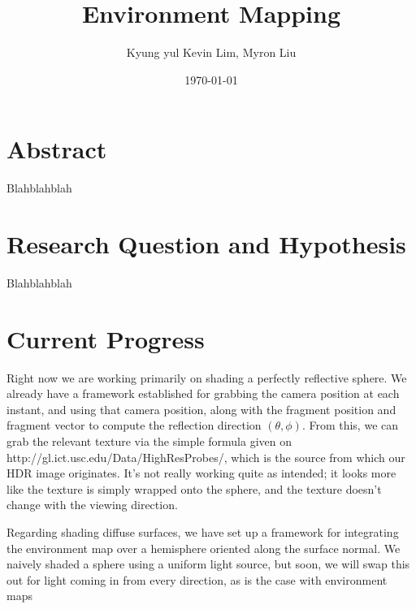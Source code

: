 \documentclass[12pt]{article}
\begin{document}
\title{Environment Mapping}
\author{Kyung yul Kevin Lim, Myron Liu}
\date{\today}
\maketitle

\section{Abstract}
Blahblahblah

\section{Research Question and Hypothesis}
Blahblahblah

\section{Current Progress}


Right now we are working primarily on shading a perfectly reflective sphere. We already have a framework established for grabbing the camera position at each instant, and using that camera position, along with the fragment position and fragment vector to compute the reflection direction $(\theta,\phi)$. From this, we can grab the relevant texture via the simple formula given on http://gl.ict.usc.edu/Data/HighResProbes/, which is the source from which our HDR image originates. It's not really working quite as intended; it looks more like the texture is simply wrapped onto the sphere, and the texture doesn't change with the viewing direction.

Regarding shading diffuse surfaces, we have set up a framework for integrating the environment map over a hemisphere oriented along the surface normal. We naively shaded a sphere using a uniform light source, but soon, we will swap this out for light coming in from every direction, as is the case with environment maps

%
%
\end{document}
